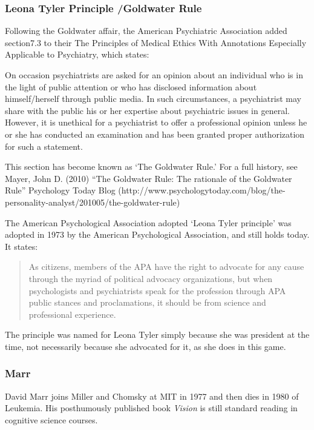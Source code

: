\begin{refsection}
\subsubsection{Leona Tyler Principle \slash  Goldwater Rule}
\label{leonatylerprinciplegoldwaterrule}

Following the Goldwater affair, the American Psychiatric Association added section7.3 to their The Principles of Medical Ethics With Annotations Especially Applicable to Psychiatry, which states:

On occasion psychiatrists are asked for an opinion about an individual who is in the light of public attention or who has disclosed information about himself\slash herself through public media. In such circumstances, a psychiatrist may share with the public his or her expertise about psychiatric issues in general. However, it is unethical for a psychiatrist to offer a professional opinion unless he or she has conducted an examination and has been granted proper authorization for such a statement.

This section has become known as `The Goldwater Rule.' For a full history, see Mayer, John D. (2010) ``The Goldwater Rule: The rationale of the Goldwater Rule'' Psychology Today Blog (http:\slash \slash www.psychologytoday.com\slash blog\slash the-personality-analyst\slash 201005\slash the-goldwater-rule)

The American Psychological Association adopted `Leona Tyler principle' was adopted in 1973 by the American Psychological Association, and still holds today. It states:

\begin{quote}

As citizens, members of the APA have the right to advocate for any cause through the myriad of political advocacy organizations, but when psychologists and psychiatrists speak for the profession through APA public stances and proclamations, it should be from science and professional experience. 
\end{quote}

The principle was named for Leona Tyler simply because she was president at the time, not necessarily because she advocated for it, as she does in this game. 

\subsubsection{Marr}
\label{marr}

David Marr joins Miller and Chomsky at MIT in 1977 and then dies in 1980 of Leukemia. His posthumously published book \emph{Vision} is still standard reading in cognitive science courses.


\end{refsection}
